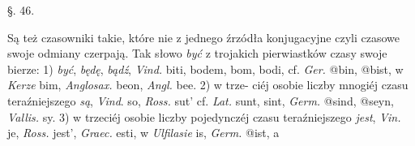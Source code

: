 §. 46.

Są też czasowniki takie, które nie z jednego źrzódła
konjugacyjne czyli czasowe swoje odmiany czerpają. Tak
słowo \textit{być} z trojakich pierwiastków czasy swoje bierze: 1)
\textit{być}, \textit{będę}, \textit{bądź}, \textit{Vind.} biti, bodem, bom, bodi, cf. \textit{Ger.}
@{bin}, @{bist}, w \textit{Kerze} bim, \textit{Anglosax.} beon, \textit{Angl.} bee. 2) w trze-
ciéj osobie liczby mnogiéj czasu teraźniejszego \textit{są}, \textit{Vind}. so,
\textit{Ross.} sut' cf. \textit{Lat.} sunt, sint, \textit{Germ.} @{sind}, @{seyn}, \textit{Vallis.} sy. 3)
w trzeciéj osobie liczby pojedynczéj czasu teraźniejszego \textit{jest},
\textit{Vin.} je, \textit{Ross.} jest', \textit{Graec.} esti, w \textit{Ulfilasie} is, \textit{Germ.} @{ist}, a


